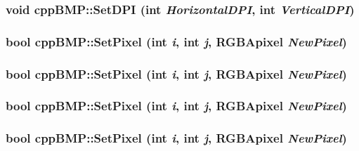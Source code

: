\hypertarget{classcpp_b_m_p_96505f0e4666bd19d0c60e8eed948158}{
\subsubsection[{SetDPI}]{\setlength{\rightskip}{0pt plus 5cm}void cppBMP::SetDPI (int {\em HorizontalDPI}, \/  int {\em VerticalDPI})}}
\label{classcpp_b_m_p_96505f0e4666bd19d0c60e8eed948158}


\hypertarget{classcpp_b_m_p_3d02d63c0abf0c87bb3698b26ac78dae}{
\subsubsection[{SetPixel}]{\setlength{\rightskip}{0pt plus 5cm}bool cppBMP::SetPixel (int {\em i}, \/  int {\em j}, \/  {\bf RGBApixel} {\em NewPixel})}}
\label{classcpp_b_m_p_3d02d63c0abf0c87bb3698b26ac78dae}


\hypertarget{classcpp_b_m_p_3d02d63c0abf0c87bb3698b26ac78dae}{
\subsubsection[{SetPixel}]{\setlength{\rightskip}{0pt plus 5cm}bool cppBMP::SetPixel (int {\em i}, \/  int {\em j}, \/  {\bf RGBApixel} {\em NewPixel})}}
\label{classcpp_b_m_p_3d02d63c0abf0c87bb3698b26ac78dae}


\hypertarget{classcpp_b_m_p_3d02d63c0abf0c87bb3698b26ac78dae}{
\subsubsection[{SetPixel}]{\setlength{\rightskip}{0pt plus 5cm}bool cppBMP::SetPixel (int {\em i}, \/  int {\em j}, \/  {\bf RGBApixel} {\em NewPixel})}}
\label{classcpp_b_m_p_3d02d63c0abf0c87bb3698b26ac78dae}


\hypertarget{classcpp_b_m_p_3d02d63c0abf0c87bb3698b26ac78dae}{
\subsubsection[{SetPixel}]{\setlength{\rightskip}{0pt plus 5cm}bool cppBMP::SetPixel (int {\em i}, \/  int {\em j}, \/  {\bf RGBApixel} {\em NewPixel})}}
\label{classcpp_b_m_p_3d02d63c0abf0c87bb3698b26ac78dae}


